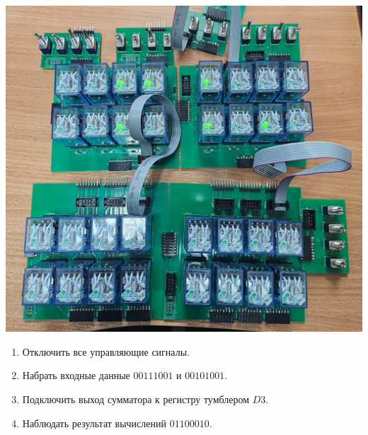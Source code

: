 \includegraphics[width=0.5\columnwidth]{photo/8bit.jpg}

\begin{enumerate}
    \item Отключить все управляющие сигналы.
    \item Набрать входные данные $0011 1001$ и $0010 1001$.
    \item Подключить выход сумматора к регистру тумблером $D3$.
    \item Наблюдать результат вычислений $0110 0010$.
\end{enumerate}

